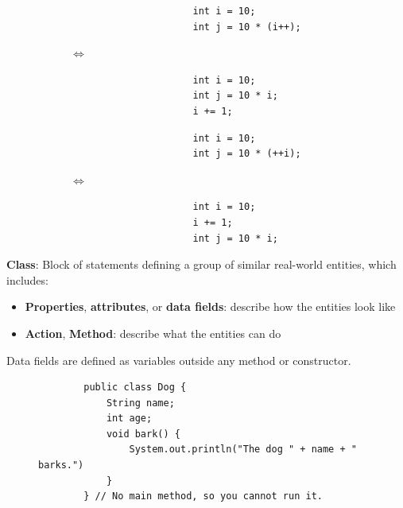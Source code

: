 \documentclass{article}
\begin{document}
\begin{figure}[h]
	\centering
	\begin{subfigure}[h]{\textwidth}
		\centering
		\begin{subfigure}[h]{.3\textwidth}
			\centering
			\begin{verbatim}
				int i = 10;
				int j = 10 * (i++);
			\end{verbatim}
		\end{subfigure}
		$\Longleftrightarrow$
		\begin{subfigure}[h]{.3\textwidth}
			\centering
			\begin{verbatim}
				int i = 10;
				int j = 10 * i;
				i += 1;
			\end{verbatim}
		\end{subfigure}
	\end{subfigure}
	\begin{subfigure}[h]{\textwidth}
		\centering
		\begin{subfigure}[h]{.3\textwidth}
			\centering
			\begin{verbatim}
				int i = 10;
				int j = 10 * (++i);
			\end{verbatim}
		\end{subfigure}
		$\Longleftrightarrow$
		\begin{subfigure}[h]{.3\textwidth}
			\centering
			\begin{verbatim}
				int i = 10;
				i += 1;
				int j = 10 * i;
			\end{verbatim}
		\end{subfigure}
	\end{subfigure}
\end{figure}

\textbf{Class}: Block of statements defining a group of similar real-world entities, which includes:
\begin{itemize}
	\item \textbf{Properties}, \textbf{attributes}, or \textbf{data fields}: describe how the entities look like
	\item \textbf{Action}, \textbf{Method}: describe what the entities can do
\end{itemize}
Data fields are defined as variables outside any method or constructor.

\begin{figure}[h]
	\centering
	\begin{verbatim}
		public class Dog {
		    String name;
		    int age;
		    void bark() {
		        System.out.println("The dog " + name + " barks.")
		    }
		} // No main method, so you cannot run it.
	\end{verbatim}
\end{figure}
\end{document}
